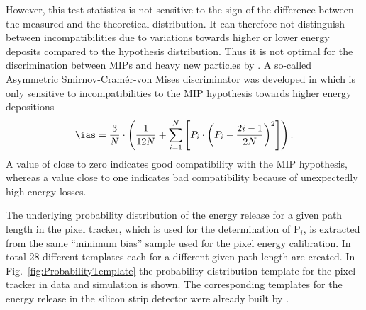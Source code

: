 However, this test statistics is not sensitive to the sign of the difference between the measured and the theoretical distribution.
It can therefore not distinguish between incompatibilities due to variations towards higher or lower energy deposits compared to the hypothesis distribution.
Thus it is not optimal for the discrimination between MIPs and heavy new particles by \dedx.
A so-called Asymmetric Smirnov-Cram\'{e}r-von Mises discriminator was developed in \cite{bib:Quertenmont_2010} which is only sensitive to incompatibilities to the MIP hypothesis towards higher energy depositions
\begin{equation}
\ias = \frac{3}{N} \cdot \left( \frac{1}{12N} + \sum\limits_{i=1}^N \left[ P_i \cdot \left(P_i - \frac{2i-1}{2N} \right)^2 \right] \right).
\end{equation}
A value of \ias close to zero indicates good compatibility with the MIP hypothesis, whereas a value close to one indicates bad compatibility because of unexpectedly high energy losses.

The underlying probability distribution of the energy release for a given path length in the pixel tracker, which is used for the determination of P$_i$, is extracted from the same ``minimum bias'' sample used for the pixel energy calibration.
In total 28 different templates each for a different given path length are created.
In Fig.~\ref{fig:ProbabilityTemplate} the probability distribution template for the pixel tracker in data and simulation is shown.
The corresponding templates for the energy release in the silicon strip detector were already built by  \cite{bib:Quertenmont_2010}.


